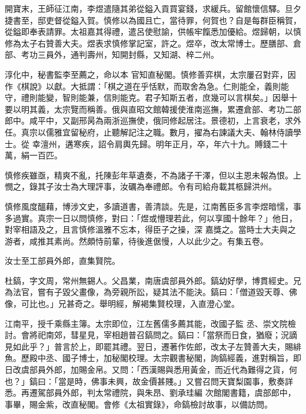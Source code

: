 \begin{pinyinscope}
 開寶末，王師征江南，李煜遣隨其弟從鎰入貢買宴錢，求緩兵。留館懷信驛。旦夕捷書至，邸吏督從鎰入賀。慎修以為國且亡，當待罪，何賀也？自是每群臣稱賀，從鎰即奉表請罪。太祖嘉其得禮，遣呂使慰諭，供帳牢餼悉加優給。煜歸朝，以慎修為太子右贊善大夫。煜表求慎修掌記室，許之。煜卒，改太常博士。歷膳部、倉部、考功三員外，通判壽州，知開封縣，又知湖、梓二州。



 淳化中，秘書監李至薦之，命以本
 官知直秘閣。慎修善弈棋，太宗屢召對弈，因作《棋說》以獻。大抵謂：「棋之道在乎恬默，而取舍為急。仁則能全，義則能守，禮則能變，智則能兼，信則能克。君子知斯五者，庶幾可以言棋矣。」因舉十要以明其義，太宗覽而稱善。俄與直昭文館韓援使淮南巡撫，累遷倉部、考功二部郎中。咸平中，又副邢昺為兩浙巡撫使，俄同修起居注。景德初，上言衰老，求外任。真宗以儒雅宜留秘府，止聽解記注之職。數月，擢為右諫議大夫、翰林侍讀學士。從
 幸澶州，遘寒疾，詔令肩輿先歸。明年正月，卒，年六十九。賻錢二十萬，絹一百匹。



 慎修疾雖亟，精爽不亂，托陳彭年草遺奏，不為諸子干澤，但以主恩未報為恨。上憫之，錄其子汝士為大理評事，汝礪為奉禮郎。令有司給舟載其柩歸洪州。



 慎修風度醞藉，博涉文史，多讀道書，善清談。先是，江南舊臣多言李煜暗懦，事多過實。真宗一日以問慎修，對曰：「煜或懵理若此，何以享國十餘年？」他日，對宰相語及之，且言慎修溫雅不忘本，得臣子之操，深
 嘉獎之。當時士大夫與之游者，咸推其素尚。然頗恃前輩，待後進倨慢，人以此少之。有集五卷。



 汝士至工部員外郎，直集賢院。



 杜鎬，字文周，常州無錫人。父昌業，南唐虞部員外郎。鎬幼好學，博貫經史。兄為法官，嘗有子毀父畫像，為旁親所訟，疑其法不能決。鎬曰：「僧道毀天尊、佛像，可比也。」兄甚奇之。舉明經，解褐集賢校理，入直澄心堂。



 江南平，授千乘縣主簿。太宗即位，江左舊儒多薦其能，改國子監
 丞、崇文院檢討。會將祀南郊，彗星見，宰相趙普召鎬問之。鎬曰：「當祭而日食，猶廢；況謫見如此乎？」普言於上，即罷其禮。翌日，遷著作佐郎，改太子左贊善大夫，賜緋魚。歷殿中丞、國子博士，加秘閣校理。太宗觀書秘閣，詢鎬經義，進對稱旨，即日改虞部員外郎，加賜金帛。又問：「西漢賜與悉用黃金，而近代為難得之貨，何也？」鎬曰：「當是時，佛事未興，故金價甚賤。」又嘗召問天寶梨園事，敷奏詳悉。再遷駕部員外郎，判太常禮院，與朱昂、劉承珪編
 次館閣書籍，虞部郎中，事畢，賜金紫，改直秘閣。會修《太祖實錄》，命鎬檢討故事，以備訪問。




\end{pinyinscope}
